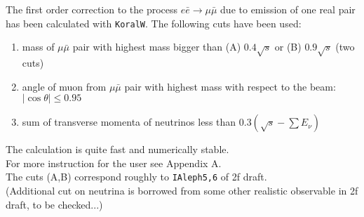 \documentclass[dvips,portrait]{seminar}             %
\begin{document}
\begin{slide*}                                                %

{\small
The first order correction to the process $e\bar e\to\mu\bar\mu$ 
due to emission of one real pair has been calculated with {\tt KoralW}.
The following cuts have been used:
{\color{blue}
\begin{enumerate}
\item
   mass of $\mu\bar\mu$ pair with highest mass bigger than (A) $0.4\sqrt{s}$ 
   or (B) $0.9\sqrt{s}$ (two cuts)
\item
   angle of muon from $\mu\bar\mu$ pair with highest mass with 
   respect to the beam: 
   $\vert\cos\theta\vert \leq 0.95$   
\item
   sum of transverse momenta of neutrinos less than
   $0.3(\sqrt{s}-\sum E_\nu)$ 
\end{enumerate}}

The calculation is quite fast and numerically stable.\\
For more instruction for the user see Appendix A.\\
The cuts (A,B)  correspond roughly to {\tt IAleph5,6} of 2f draft.\\
(Additional cut on neutrina is borrowed from some other realistic
observable in 2f draft, to be checked...)

}
\vfill
\end{slide*}   %
\end{document}
